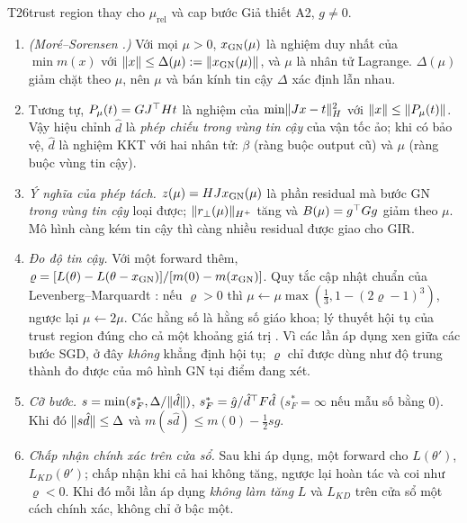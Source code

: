 \begin{namedthm}{T26}{trust region thay cho $\mu_{\mathrm{rel}}$ và cap bước}
Giả thiết A2, $g\ne0$.
\begin{enumerate}[label=(\alph*)]
\item \emph{(Moré--Sorensen \cite{more1983}.)} Với mọi $\mu>0$, $x_{\mathrm{GN}}(\mu)$ là nghiệm duy nhất của $\min m(x)$ với $\lVert x\rVert\le\Delta(\mu):=\lVert x_{\mathrm{GN}}(\mu)\rVert$, và $\mu$ là nhân tử Lagrange. $\Delta(\mu)$ giảm chặt theo $\mu$, nên $\mu$ và bán kính tin cậy $\Delta$ xác định lẫn nhau.
\item Tương tự, $P_\mu(t)=GJ^{\top} Ht$ là nghiệm của $\min\lVert Jx-t\rVert_H^2$ với $\lVert x\rVert\le\lVert P_\mu(t)\rVert$. Vậy hiệu chỉnh $\hat d$ là \emph{phép chiếu trong vùng tin cậy} của vận tốc ảo; khi có bảo vệ, $\hat d$ là nghiệm KKT với hai nhân tử: $\beta$ (ràng buộc output cũ) và $\mu$ (ràng buộc vùng tin cậy).
\item \emph{Ý nghĩa của phép tách.} $z(\mu)=HJx_{\mathrm{GN}}(\mu)$ là phần residual mà bước GN \emph{trong vùng tin cậy} loại được; $\lVert r_{\perp}(\mu)\rVert_{H^+}$ tăng và $B(\mu)=g^{\top} Gg$ giảm theo $\mu$. Mô hình càng kém tin cậy thì càng nhiều residual được giao cho GIR.
\item \emph{Đo độ tin cậy.} Với một forward thêm, $\varrho=[L(\theta)-L(\theta-x_{\mathrm{GN}})]/[m(0)-m(x_{\mathrm{GN}})]$. Quy tắc cập nhật chuẩn của Levenberg--Marquardt \cite{madsen2004}: nếu $\varrho>0$ thì $\mu\leftarrow\mu\max(\tfrac13,1-(2\varrho-1)^3)$, ngược lại $\mu\leftarrow2\mu$. Các hằng số là hằng số giáo khoa; lý thuyết hội tụ của trust region đúng cho cả một khoảng giá trị \cite{nocedal2006}. Vì các lần áp dụng xen giữa các bước SGD, ở đây \emph{không} khẳng định hội tụ; $\varrho$ chỉ được dùng như độ trung thành đo được của mô hình GN tại điểm đang xét.
\item \emph{Cỡ bước.} $s=\min(s_F^*,\Delta/\lVert \hat d\rVert)$, $s_F^*=\hat g/\hat d^{\top} F\hat d$ ($s_F^*=\infty$ nếu mẫu số bằng $0$). Khi đó $\lVert s\hat d\rVert\le\Delta$ và $m(s\hat d)\le m(0)-\tfrac12s\hat g$.
\item \emph{Chấp nhận chính xác trên cửa sổ.} Sau khi áp dụng, một forward cho $L(\theta')$, $L_{KD}(\theta')$; chấp nhận khi cả hai không tăng, ngược lại hoàn tác và coi như $\varrho<0$. Khi đó mỗi lần áp dụng \emph{không làm tăng} $L$ và $L_{KD}$ trên cửa sổ một cách chính xác, không chỉ ở bậc một.
\end{enumerate}
\end{namedthm}
